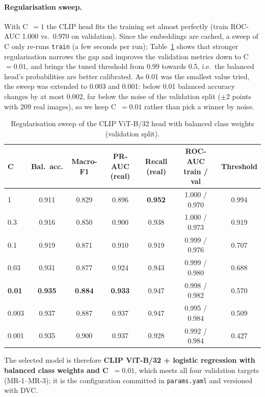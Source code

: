 \documentclass[11pt]{article}
\begin{document}
\paragraph{Regularisation sweep.} With C~$=1$ the CLIP head fits the training set almost perfectly (train ROC-AUC 1.000 vs.\ 0.970 on validation). Since the embeddings are cached, a sweep of C only re-runs \texttt{train} (a few seconds per run); Table~\ref{tab:c-sweep} shows that stronger regularisation narrows the gap and improves the validation metrics down to C~$=0.01$, and brings the tuned threshold from 0.99 towards 0.5, i.e.\ the balanced head's probabilities are better calibrated. As 0.01 was the smallest value tried, the sweep was extended to 0.003 and 0.001: below 0.01 balanced accuracy changes by at most 0.002, far below the noise of the validation split ($\pm$2 points with 209 real images), so we keep C~$=0.01$ rather than pick a winner by noise.

\begin{table}[H]
\centering
\small
\begin{tabular}{@{}lcccccc@{}}
\toprule
\textbf{C} & \textbf{Bal.\ acc.} & \textbf{Macro-F1} & \textbf{PR-AUC (real)} & \textbf{Recall (real)} & \textbf{ROC-AUC train / val} & \textbf{Threshold} \\
\midrule
1 & 0.911 & 0.829 & 0.896 & \textbf{0.952} & 1.000 / 0.970 & 0.994 \\
0.3 & 0.916 & 0.850 & 0.900 & 0.938 & 1.000 / 0.973 & 0.919 \\
0.1 & 0.919 & 0.871 & 0.910 & 0.919 & 0.999 / 0.976 & 0.707 \\
0.03 & 0.931 & 0.877 & 0.924 & 0.943 & 0.999 / 0.980 & 0.688 \\
\textbf{0.01} & \textbf{0.935} & \textbf{0.884} & \textbf{0.933} & 0.947 & 0.998 / 0.982 & 0.570 \\
0.003 & 0.937 & 0.887 & 0.937 & 0.947 & 0.995 / 0.984 & 0.509 \\
0.001 & 0.935 & 0.900 & 0.937 & 0.928 & 0.992 / 0.984 & 0.427 \\
\bottomrule
\end{tabular}
\caption{Regularisation sweep of the CLIP ViT-B/32 head with balanced class weights (validation split).}
\label{tab:c-sweep}
\end{table}

The selected model is therefore \textbf{CLIP ViT-B/32 + logistic regression with balanced class weights and C~$=0.01$}, which meets all four validation targets (MR-1--MR-3); it is the configuration committed in \texttt{params.yaml} and versioned with DVC.
\end{document}
